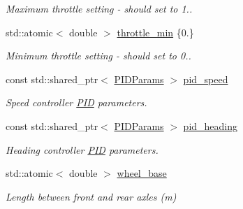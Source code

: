 \begin{DoxyCompactItemize}
\begin{DoxyCompactList}\small\item\em Maximum throttle setting -\/ should set to 1.. \end{DoxyCompactList}\item 
\mbox{\label{structackermann_1_1_params_a105dda9186730914c63f6e39593d0e77}} 
std\+::atomic$<$ double $>$ \hyperlink{structackermann_1_1_params_a105dda9186730914c63f6e39593d0e77}{throttle\+\_\+min} \{0.\}
\begin{DoxyCompactList}\small\item\em Minimum throttle setting -\/ should set to 0.. \end{DoxyCompactList}\item 
\mbox{\label{structackermann_1_1_params_adcbcf331c428efc01e2be5da332b6e99}} 
const std\+::shared\+\_\+ptr$<$ \hyperlink{structackermann_1_1_p_i_d_params}{P\+I\+D\+Params} $>$ \hyperlink{structackermann_1_1_params_adcbcf331c428efc01e2be5da332b6e99}{pid\+\_\+speed}
\begin{DoxyCompactList}\small\item\em Speed controller \hyperlink{classackermann_1_1_p_i_d}{P\+ID} parameters. \end{DoxyCompactList}\item 
\mbox{\label{structackermann_1_1_params_ab8ef5ea67822f187c7a03f94e20a24d0}} 
const std\+::shared\+\_\+ptr$<$ \hyperlink{structackermann_1_1_p_i_d_params}{P\+I\+D\+Params} $>$ \hyperlink{structackermann_1_1_params_ab8ef5ea67822f187c7a03f94e20a24d0}{pid\+\_\+heading}
\begin{DoxyCompactList}\small\item\em Heading controller \hyperlink{classackermann_1_1_p_i_d}{P\+ID} parameters. \end{DoxyCompactList}\item 
\mbox{\label{structackermann_1_1_params_a68ecfa01510e295926dd23b1cfb1d83a}} 
std\+::atomic$<$ double $>$ \hyperlink{structackermann_1_1_params_a68ecfa01510e295926dd23b1cfb1d83a}{wheel\+\_\+base}
\begin{DoxyCompactList}\small\item\em Length between front and rear axles (m) \end{DoxyCompactList}\item 

\end{DoxyCompactItemize}
